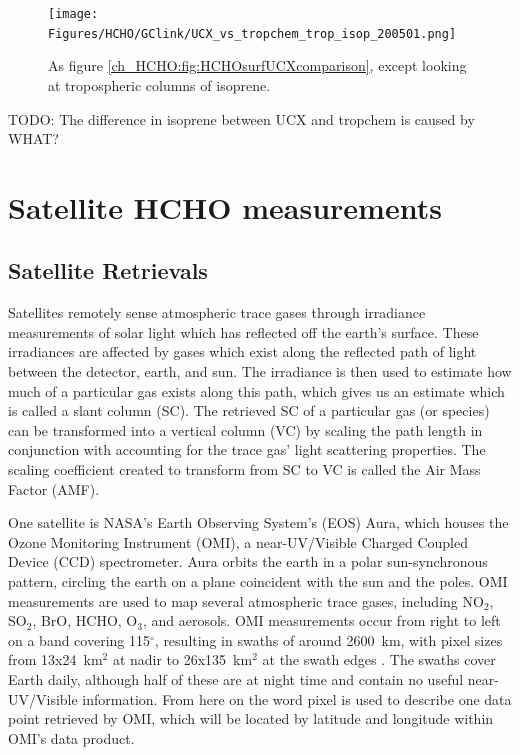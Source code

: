     \begin{figure}[!htbp]
      \texttt{[image: Figures/HCHO/GClink/UCX\_vs\_tropchem\_trop\_isop\_200501.png]}
      \caption{%
	As figure \ref{ch_HCHO:fig:HCHOsurfUCXcomparison}, except looking at tropospheric columns of isoprene.
      }
      \label{ch_HCHO:fig:isoptropUCXcomparison}
    \end{figure}
    
    TODO: The difference in isoprene between UCX and tropchem is caused by WHAT?
    
\section{Satellite HCHO measurements}
\label{ch_HCHO:sec:satelliteHCHO}
  \subsection{Satellite Retrievals}
    Satellites remotely sense atmospheric trace gases through irradiance measurements of solar light which has reflected off the earth's surface. 
    These irradiances are affected by gases which exist along the reflected path of light between the detector, earth, and sun. 
    The irradiance is then used to estimate how much of a particular gas exists along this path, which gives us an estimate which is called a slant column (SC).
    The retrieved SC of a particular gas (or species) can be transformed into a vertical column (VC) by scaling the path length in conjunction with accounting for the trace gas' light scattering properties.
    The scaling coefficient created to transform from SC to VC is called the Air Mass Factor (AMF).

    One satellite is NASA's Earth Observing System's (EOS) Aura, which houses the Ozone Monitoring Instrument (OMI), a near-UV/Visible Charged Coupled Device (CCD) spectrometer.
    Aura orbits the earth in a polar sun-synchronous pattern, circling the earth on a plane coincident with the sun and the poles. 
    OMI measurements are used to map several atmospheric trace gases, including NO$_2$, SO$_2$, BrO, HCHO, O$_3$, and aerosols.
    OMI measurements occur from right to left on a band covering 115$^{\circ}$, resulting in swaths of around 2600~km, with pixel sizes from 13x24~km$^2$ at nadir to 26x135~km$^2$ at the swath edges \citep{Abad2015}.
    The swaths cover Earth daily, although half of these are at night time and contain no useful near-UV/Visible information.
    From here on the word pixel is used to describe one data point retrieved by OMI, which will be located by latitude and longitude within OMI's data product.
    
